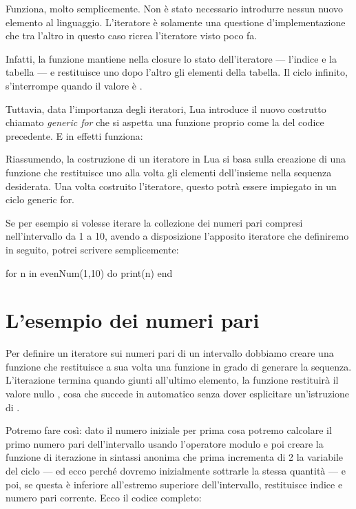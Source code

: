 Funziona, molto semplicemente. Non è stato necessario introdurre nessun nuovo
elemento al linguaggio. L'iteratore è solamente una questione d'implementazione
che tra l'altro in questo caso ricrea l'iteratore  visto poco fa.

Infatti, la funzione  mantiene nella closure lo stato
dell'iteratore --- l'indice  e la tabella  --- e restituisce uno
dopo l'altro gli elementi della tabella. Il ciclo 
infinito, s'interrompe quando il valore è .

Tuttavia, data l'importanza degli iteratori, Lua introduce il nuovo costrutto
chiamato \emph{generic for} che si aspetta una funzione proprio come la
 del codice precedente. E in effetti funziona:

Riassumendo, la costruzione di un iteratore in Lua si basa sulla creazione di
una funzione che restituisce uno alla volta gli elementi dell'insieme nella
sequenza desiderata. Una volta costruito l'iteratore, questo potrà essere
impiegato in un ciclo generic for.

Se per esempio si volesse iterare la collezione dei numeri pari compresi
nell'intervallo da 1 a 10, avendo a disposizione l'apposito iteratore
 che definiremo in seguito, potrei scrivere semplicemente:
\begin{lines}
for n in evenNum(1,10) do
    print(n)
end
\end{lines}


\section{L'esempio dei numeri pari}

Per definire un iteratore sui numeri pari di un intervallo dobbiamo creare una
funzione che restituisce a sua volta una funzione in grado di generare la
sequenza. L'iterazione termina quando giunti all'ultimo elemento, la funzione
restituirà il valore nullo , cosa che succede in automatico senza dover
esplicitare un'istruzione di .

Potremo fare così: dato il numero iniziale per prima cosa potremo calcolare il
primo numero pari dell'intervallo usando l'operatore modulo \key{\%}\luas{\%} e
poi creare la funzione di iterazione in sintassi anonima che prima incrementa di
2 la variabile del ciclo --- ed ecco perché dovremo inizialmente sottrarle la
stessa quantità --- e poi, se questa è inferiore all'estremo superiore
dell'intervallo, restituisce indice e numero pari corrente. Ecco il codice
completo:

